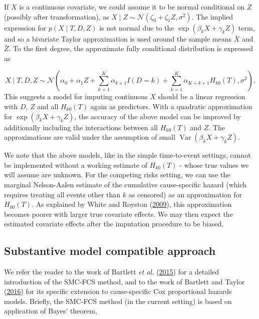 \documentclass[
  letterpaper,
  DIV=11,
  numbers=noendperiod]{scrreprt}
\DeclareMathOperator{\Var}{Var}
\begin{document}
If \(X\) is a continuous covariate, we could assume it to be normal
conditional on \(Z\) (possibly after transformation), as
\(X \mid Z \sim \mathcal{N}(\zeta_0 + \zeta_1 Z, \sigma^2)\). The
implied expression for \(p(X \mid T, D, Z)\) is not normal due to the
\(\exp(\beta_k X + \gamma_k Z)\) term, and so a bivariate Taylor
approximation is used around the sample means \(\bar{X}\) and
\(\bar{Z}\). To the first degree, the approximate fully conditional
distribution is expressed as

\begin{equation*}
    X \mid T, D, Z \sim \mathcal{N}(\alpha_0 + \alpha_1 Z + \sum^K_{k = 1} \alpha_{k+1} I(D=k) + \sum^K_{k = 1} \alpha_{K + k + 1} H_{k0}(T),\sigma^2).
\end{equation*} This suggests a model for imputing continuous \(X\)
should be a linear regression with \(D\), \(Z\) and all \(H_{k0}(T)\)
again as predictors. With a quadratic approximation for
\(\exp(\beta_k X + \gamma_k Z)\), the accuracy of the above model can be
improved by additionally including the interactions between all
\(H_{k0}(T)\) and \(Z\). The approximations are valid under the
assumption of small \(\Var(\beta_k X + \gamma_k Z)\).

We note that the above models, like in the simple time-to-event
settings, cannot be implemented without a working estimate of
\(H_{k0}(T)\) - whose true values we will assume are unknown. For the
competing risks setting, we can use the marginal Nelson-Aalen estimate
of the cumulative cause-specific hazard (which requires treating all
events other than \(k\) as censored) as an approximation for
\(H_{k0}(T)\). As explained by White and Royston
(\protect\hyperlink{ref-whiteImputingMissingCovariate2009}{2009}), this
approximation becomes poorer with larger true covariate effects. We may
then expect the estimated covariate effects after the imputation
procedure to be biased.

\hypertarget{sec-smcfcs-theory}{%
\subsection{Substantive model compatible
approach}\label{sec-smcfcs-theory}}

We refer the reader to the work of Bartlett \emph{et al.}
(\protect\hyperlink{ref-bartlettMultipleImputationCovariates2015}{2015})
for a detailed introduction of the SMC-FCS method, and to the work of
Bartlett and Taylor
(\protect\hyperlink{ref-bartlettMissingCovariatesCompeting2016}{2016})
for its specific extension to cause-specific Cox proportional hazards
models. Briefly, the SMC-FCS method (in the current setting) is based on
application of Bayes' theorem,
\end{document}
